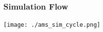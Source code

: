 \documentclass{beamer}
\begin{document}
\begin{frame}
    \frametitle{Simulation Flow}

    \begin{block}{}
        \texttt{[image: ./ams\_sim\_cycle.png]}
    \end{block}

\end{frame}
\end{document}
